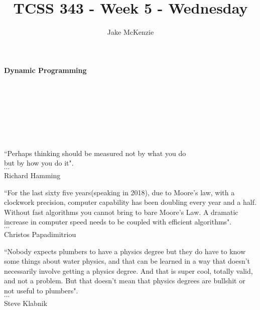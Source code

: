 \documentclass[12pt]{article}
\begin{document}
\title{TCSS 343 - Week 5 - Wednesday}
\author{Jake McKenzie}
\maketitle
\noindent\centerline{\textbf{Dynamic Programming}}\\\\\\\\\\\\
\begin{center}
    ``Perhaps thinking should be measured not by what you do \\but by how you do it". \\$\cdots$\\ Richard Hamming
\end{center}
\begin{center}
    ``For the last sixty five years(speaking in 2018), due to Moore's law, with a clockwork precision, computer capability has been doubling every year and a half. Without fast algorithms you cannot bring to bare Moore's Law. A dramatic increase in computer speed needs to be coupled with efficient algorithms". \\$\cdots$\\ Christos Papadimitriou
\end{center}
\begin{center}
    ``Nobody expects plumbers to have a physics degree but they do have to know some things about water physics, and that can be learned in a way that doesn’t necessarily involve getting a physics degree. And that is super cool, totally valid, and not a problem. But that doesn’t mean that physics degrees are bullshit or not useful to plumbers". \\$\cdots$\\ Steve Klabnik 
\end{center}
\newpage
\end{document}
